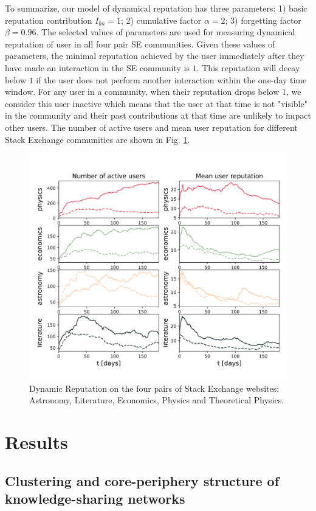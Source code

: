 To summarize, our model of dynamical reputation has three parameters: 1) basic reputation contribution $I_{bn}=1$; 2) cumulative factor $\alpha=2$; 3) forgetting factor $\beta=0.96$. The selected values of parameters are used for measuring dynamical reputation of user in all four pair SE communities. Given these values of parameters, the minimal reputation achieved by the user immediately after they have made an interaction in the SE community is $1$. This reputation will decay below $1$ if the user does not perform another interaction within the one-day time window. For any user in a community, when their reputation drops below $1$, we consider this user inactive which means that the user at that time is not "visible" in the community and their past contributions at that time are unlikely to impact other users. The number of active users and mean user reputation for different Stack Exchange communities are shown in Fig. \ref{fig:dr6panel}.

\begin{figure}
	\centering
	\includegraphics[width=0.5\linewidth]{Figures/active_users_mean_dyn_rep.png}
	\caption{Dynamic Reputation on the four pairs of Stack Exchange websites: Astronomy, Literature, Economics,  Physics and Theoretical Physics.}
	\label{fig:dr6panel}
\end{figure}

\section{Results \label{sec:res}}

\subsection{Clustering and core-periphery structure of knowledge-sharing networks}

